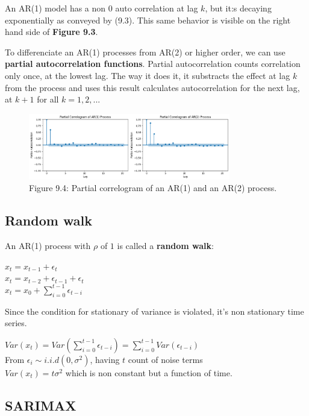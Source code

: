 An AR(1) model has a non \(0\) auto correlation at lag \(k\), but it:s decaying exponentially as conveyed by (9.3). This same behavior is visible on the right hand side of \textbf{Figure 9.3}.

To differenciate an AR(1) processes from AR(2) or higher order, we can use \textbf{partial autocorrelation functions}. Partial autocorrelation counts correlation only once, at the lowest lag. The way it does it, it substracts the effect at lag \(k\) from the process and uses this result calculates autocorrelation for the next lag, at \(k+1\) for all \(k=1,2,...\)


\begin{figure}[htbp]
    \begin{center}
        \includegraphics[width=250pt]{../img/09-ar-1-and-2.png}
        \caption{Figure 9.4:  Partial correlogram of an AR(1) and an AR(2) process.}
    \end{center}
\end{figure}


\subsection{Random walk}

An AR(1) process with \(\rho\) of \(1\) is called a \textbf{random walk}:

\(x_t = x_{t-1} + \epsilon_t\)\\
\(x_t = x_{t-2} + \epsilon_{t-1} + \epsilon_t\)\\
\(x_t = x_0 + \sum_{i=0}^{t-1} \epsilon_{t-i}\)

Since the condition for stationary of variance is violated, it's non stationary time series.

\(Var(x_t) = Var(\sum_{i=0}^{t-1} \epsilon_{t-i}) = \sum_{i=0}^{t-1} Var(\epsilon_{t-i})\)\\
From \(\epsilon_i \sim i.i.d(0, \sigma^2)\), having \(t\) count of noise terms\\
\(Var(x_t) = t \sigma^2\) which is non constant but a function of time.

\subsection{SARIMAX}

